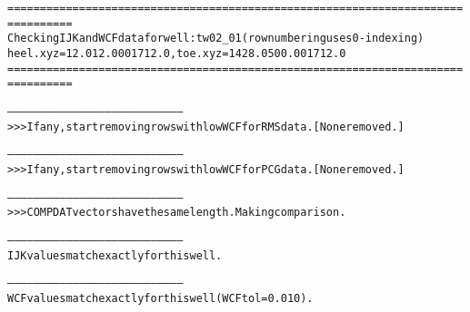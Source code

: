 \begin{alltt}
================================================================================
Checking IJK and WCF data for well: tw02_01 (row numbering uses 0-indexing)
heel.xyz = 12.0 12.000 1712.0, toe.xyz = 1428.0 500.00 1712.0
================================================================================

--------------------------------------------------------------------------------
>>> If any, start removing rows with low WCF for RMS data. [None removed.]

--------------------------------------------------------------------------------
>>> If any, start removing rows with low WCF for PCG data. [None removed.]

--------------------------------------------------------------------------------
>>> COMPDAT vectors have the same length. Making comparison.

--------------------------------------------------------------------------------
IJK values match exactly for this well.

--------------------------------------------------------------------------------
WCF values match exactly for this well (WCF tol = 0.010).
\end{alltt}
